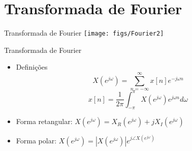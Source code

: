 \section[slide=true]{Transformada de Fourier}
\begin{slide}[toc=]{Transformada de Fourier}
		{
			\texttt{[image: figs/Fourier2]}%
		}
\end{slide}

\begin{slide}[toc=]{Transformada de Fourier}
 \begin{itemize}
  \item Defini\c c\~oes
     \begin{equation*} X(e^{j\omega})=\sum_{n=-\infty}^{\infty} x[n]e^{-j\omega n}  \end{equation*}
     \begin{equation*} x[n]=\frac{1}{2\pi}\int_{-\pi}^{\pi} X(e^{j\omega})e^{j\omega n} d\omega \end{equation*}
   \item Forma retangular: $X(e^{j\omega}) = X_R(e^{j\omega}) + j X_I(e^{j\omega})$
   \item Forma polar: $X(e^{j\omega}) = |X(e^{j\omega})|e^{j\angle X(e^{j\omega})}$
 \end{itemize}
\end{slide}

